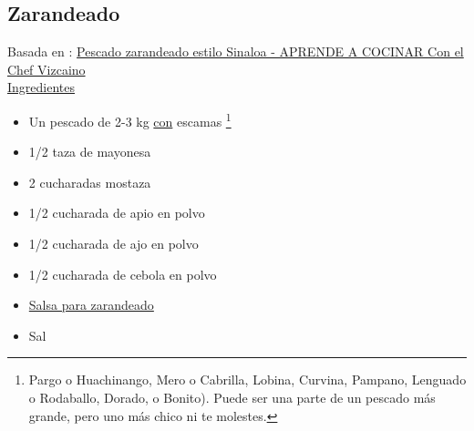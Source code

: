 \subsection{Zarandeado}
\label{receta:zarandeado}

Basada en : \href{https://aprendeacocinarfacil.wordpress.com/2012/03/13/pescado-sarandeado-estilo-sinaloa-aya-pinchi/}{Pescado zarandeado estilo Sinaloa - APRENDE A COCINAR Con el Chef Vizcaino} \\

\underline{Ingredientes}
\begin{itemize}
\item Un pescado de 2-3 kg \underline{con} escamas \footnote{Pargo o Huachinango, Mero o Cabrilla, Lobina, Curvina, Pampano, Lenguado o Rodaballo, Dorado, o Bonito). Puede ser una parte de un pescado más grande, pero uno más chico ni te molestes.}
\item 1/2 taza de mayonesa
\item 2 cucharadas mostaza
\item 1/2 cucharada de apio en polvo
\item 1/2 cucharada de ajo en polvo
\item 1/2 cucharada de cebola en polvo
\item \hyperref[salsa-zarandeado]{Salsa para zarandeado}
\item Sal
\end{itemize}

